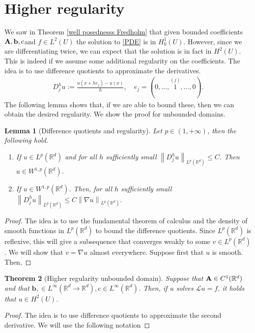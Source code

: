 \documentclass[
    a4paper,
    DIV=14,
    abstract=true,
    numbers=noenddot
]
{scrartcl}
\newtheorem{theorem}{Theorem}[section]
\newtheorem{lemma}[theorem]{Lemma}
\theoremstyle{definition}
\renewcommand{\norm}[1]{\left\lVert #1 \right\rVert}\renewcommand{\abs}[1]{\left| #1 \right|}
\newcommand{\R}{\mathbb{R}}
\newcommand{\Ll}{\mathcal{L}}
\begin{document}
\section{Higher regularity}
We saw in Theorem \ref{well posednesss Fredholm} that given bounded coefficients $\vb{A},\vb{b},c$and $f \in L^2(U)$ the solution to \eqref{PDE} is in $H_0^1(U)$. However, since we are differentiating twice, we can expect that the solution is in fact in $H^2(U)$. This is indeed if we assume some additional regularity on the coefficients. The idea is to use difference quotients to approximate the derivatives.
\begin{align*}
	D_j^h u := \frac{u(x+ he_j)-u(x)}{h},\quad   e_j=(0,\ldots,\overset{(j)}{1},\ldots,0).
\end{align*}
The following lemma shows that, if we are able to bound these, then we can obtain the desired regularity. We show the proof for unbounded domains.
\begin{lemma}[Difference quotients and regularity]
	Let  $p \in (1, +\infty)$, then the following hold.
	\begin{enumerate}
		\item 	If $u \in L^p(\R^d)$ and for all $h$ sufficiently small $\norm{D_j^h u}_{L^p(\R^d)} \leq C$. Then $u \in W^{1,p}(\R^d)$.
		\item  If $u \in W^{1,p}(\R^d)$. Then, for all $h$ sufficiently small $\norm{D_j^h u}_{L^p(\R^d)} \leq C\norm{\nabla u}_{L^p(\R^d)}.$
	\end{enumerate}
\end{lemma}
\begin{proof}
	The idea is to use the fundamental theorem of calculus and the density of smooth functions in $L^p(\R^d)$  to bound the difference quotients. Since $L^p(\R^d)$ is reflexive, this will give a subsequence that converges weakly to some $v \in L^p(\R^d)$. We will show that $v=\nabla u$ almost everywhere.  Suppose first that $u$ is smooth. Then,

\end{proof}


\begin{theorem}[Higher regularity unbounded domain]
	Suppose that $\vb{A}\in C^1(\R^d)$ and that $\bm{b},  \in L^\infty(\R^d \to \R^d), c \in L^\infty(\R^d)$. Then, if $u$ solves $\Ll u=f$, it holds that $u \in H^2(U)$.
\end{theorem}
\begin{proof}
	The idea is to use difference quotients to approximate the second derivative. We will use the following notation
\end{proof}
\end{document}
